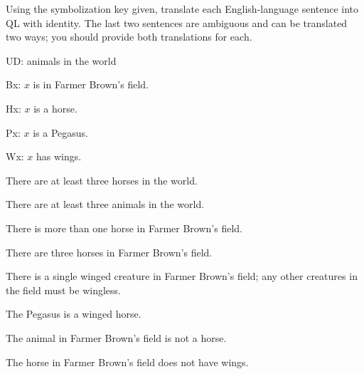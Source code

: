\problempart Using the symbolization key given, translate each English-language sentence into QL with identity. The last two sentences are ambiguous and can be translated two ways; you should provide both translations for each.
\begin{ekey}
\item[UD:] animals in the world
\item[Bx:] $x$ is in Farmer Brown's field.
\item[Hx:] $x$ is a horse.
\item[Px:] $x$ is a Pegasus.
\item[Wx:] $x$ has wings.
\end{ekey}
\begin{earg}
\item There are at least three horses in the world.
\item There are at least three animals in the world.
\item There is more than one horse in Farmer Brown's field.
\item There are three horses in Farmer Brown's field.
\item There is a single winged creature in Farmer Brown's field; any other creatures in the field must be wingless.
\item The Pegasus is a winged horse.
\item The animal in Farmer Brown's field is not a horse.
\item The horse in Farmer Brown's field does not have wings.
\end{earg}





